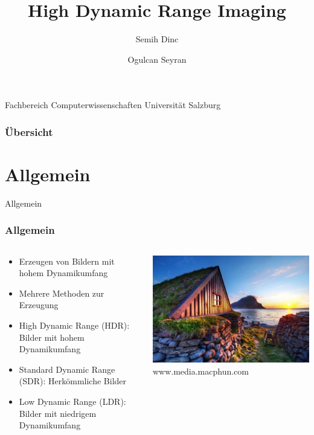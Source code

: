 \documentclass{beamer}
\title{High Dynamic Range Imaging}
\author{Semih Dinc \and Ogulcan Seyran}
\date{}
\begin{document}
	\begin{frame}
		\titlepage
		\begin{center}
			Fachbereich Computerwissenschaften Universität Salzburg
		\end{center}
	\end{frame}

	\begin{frame}
		\frametitle{Übersicht}
		\tableofcontents
	\end{frame}

	\section{Allgemein}
	
	\begin{frame}
		\begin{center}
			\Huge Allgemein
		\end{center}
	\end{frame}

	\begin{frame}
		\frametitle{Allgemein}
		\begin{columns}
			\begin{column}{0.7\textwidth}
				\begin{itemize}[label=\textcolor{red!65!black}{\textbullet}]
					\item Erzeugen von Bildern mit hohem Dynamikumfang
					\item Mehrere Methoden zur Erzeugung
					\item High Dynamic Range (HDR): Bilder mit hohem Dynamikumfang
					\item Standard Dynamic Range (SDR): Herkömmliche Bilder
					\item Low Dynamic Range (LDR): Bilder mit niedrigem Dynamikumfang
				\end{itemize}
			\end{column}
			\begin{column}{0.3\textwidth}
					\includegraphics[width=\textwidth]{img/bild1.jpg}
					\tiny www.media.macphun.com
			\end{column}
		\end{columns}
	\end{frame}
\end{document}
